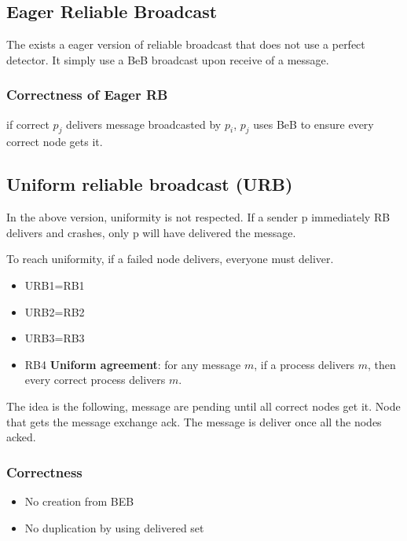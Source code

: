 \subsection{Eager Reliable Broadcast}
The exists a eager version of reliable broadcast that does not use a
perfect detector. It simply use a BeB broadcast upon receive of a
message.

    

\subsubsection{Correctness of Eager RB}
if correct $p_j$ delivers message broadcasted by $p_i$,
$p_j$ uses BeB to ensure every correct node gets it.

\subsection{Uniform reliable broadcast (URB)}
In the above version, uniformity is not respected. If a sender
p immediately RB delivers and crashes, only p will have delivered
the message.

To reach uniformity, if a failed node delivers, everyone must deliver.

\begin{itemize}
    \item URB1=RB1
    \item URB2=RB2
    \item URB3=RB3
    \item RB4 \textbf{Uniform agreement}: for any message $m$, if a process
    delivers $m$, then every correct process delivers $m$.
\end{itemize}



The idea is the following, message are pending until all correct
nodes get it. Node that gets the message exchange ack. The
message is deliver once all the nodes acked.

\subsubsection{Correctness}
\begin{itemize}
    \item No creation from BEB
    \item No duplication by using delivered set
\end{itemize}

